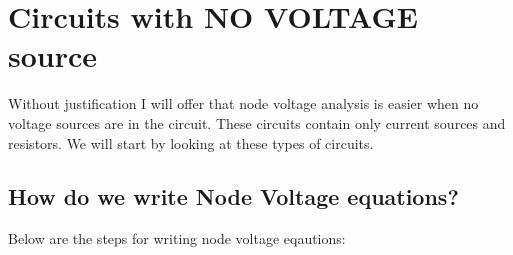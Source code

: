 \documentclass{handout}
\begin{document}
\newpage
\pagebreak
\clearpage

\section{Circuits with NO VOLTAGE source}
Without justification I will offer that node voltage analysis is easier when no voltage sources are in the circuit.  These circuits contain only current sources and resistors.  We will start by looking at these types of circuits.

\subsection{How do we write Node Voltage equations?}
Below are the steps for writing node voltage eqautions:
\newpage
\pagebreak
\clearpage
\end{document}
